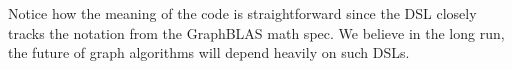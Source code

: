 Notice how the meaning of the code
is straightforward since the DSL closely tracks the notation from the GraphBLAS math spec.  We believe in the long run, the 
future of graph algorithms will depend heavily on such DSLs.


